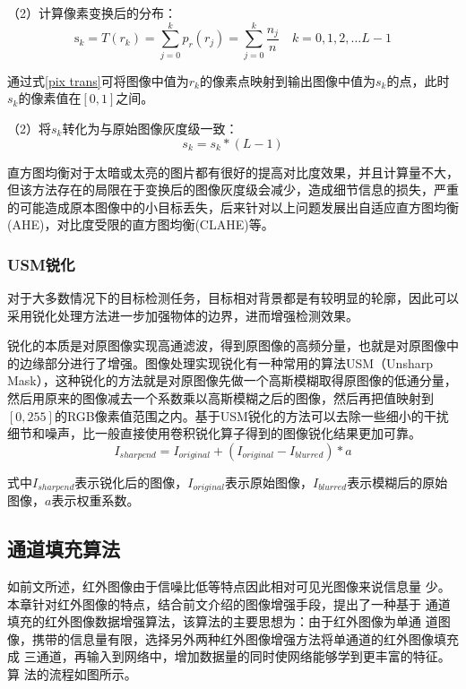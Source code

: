 （2）计算像素变换后的分布：
\begin{equation}
  \mathrm{s}_{k}=T\left(r_{k}\right)=\sum_{j=0}^{k} p_{r}\left(r_{j}\right)=\sum_{j=0}^{k} \frac{n_{j}}{n} \quad k=0,1,2, \ldots L-1
  \label{pix trans}
\end{equation}

通过式\ref{pix trans}可将图像中值为$r_{k}$的像素点映射到输出图像中值为$s_{k}$的点，此时$s_{k}$的像素值在$[0,1]$之间。

（2）将$s_{k}$转化为与原始图像灰度级一致：
\begin{equation}
  s_{k}=s_{k} *(L-1)
\end{equation}

直方图均衡对于太暗或太亮的图片都有很好的提高对比度效果，并且计算量不大，但该方法存在的局限在于变换后的图像灰度级会减少，造成细节信息的损失，严重的可能造成原本图像中的小目标丢失，后来针对以上问题发展出自适应直方图均衡(AHE)，对比度受限的直方图均衡(CLAHE)等。

\subsubsection{USM锐化}
对于大多数情况下的目标检测任务，目标相对背景都是有较明显的轮廓，因此可以采用锐化处理方法进一步加强物体的边界，进而增强检测效果。

锐化的本质是对原图像实现高通滤波，得到原图像的高频分量，也就是对原图像中的边缘部分进行了增强。图像处理实现锐化有一种常用的算法USM（Unsharp Mask），这种锐化的方法就是对原图像先做一个高斯模糊取得原图像的低通分量，然后用原来的图像减去一个系数乘以高斯模糊之后的图像，然后再把值映射到$[0,255]$的RGB像素值范围之内。基于USM锐化的方法可以去除一些细小的干扰细节和噪声，比一般直接使用卷积锐化算子得到的图像锐化结果更加可靠。
\begin{equation}
  I_{sharpend}=I_{original}+(I_{original}-I_{blurred})*a
\end{equation}

式中$I_{sharpend}$表示锐化后的图像，$I_{original}$表示原始图像，$I_{blurred}$表示模糊后的原始图像，$a$表示权重系数。

\subsection{通道填充算法}
如前文所述，红外图像由于信噪比低等特点因此相对可见光图像来说信息量
少。本章针对红外图像的特点，结合前文介绍的图像增强手段，提出了一种基于
通道填充的红外图像数据增强算法，该算法的主要思想为：由于红外图像为单通
道图像，携带的信息量有限，选择另外两种红外图像增强方法将单通道的红外图像填充成
三通道，再输入到网络中，增加数据量的同时使网络能够学到更丰富的特征。算
法的流程如图所示。

